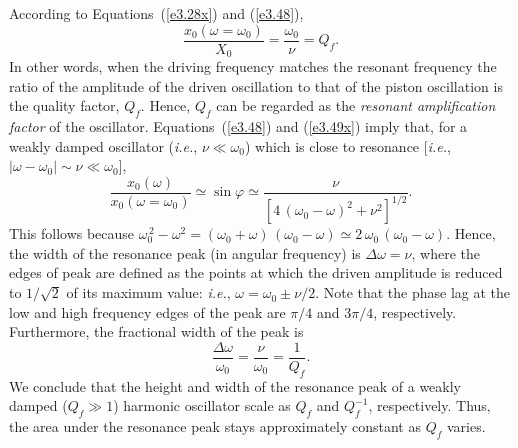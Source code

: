 According to Equations~(\ref{e3.28x}) and (\ref{e3.48}),
\begin{equation}\label{e3.50}
\frac{x_0(\omega=\omega_0)}{X_0} = \frac{\omega_0}{\nu}
=Q_f.
\end{equation}
In other words, when the driving frequency matches the resonant frequency the ratio of the  amplitude of the driven oscillation
to that of the piston oscillation is the quality factor, $Q_f$. Hence, $Q_f$ can be regarded as the {\em resonant
amplification factor}\/ of the oscillator.  
Equations~(\ref{e3.48}) and (\ref{e3.49x}) imply that,
for a weakly damped oscillator ({\em i.e.}, $\nu\ll \omega_0$) which
is close to resonance [{\em i.e.}, $|\omega-\omega_0|\sim \nu\ll \omega_0$],
\begin{equation}\label{e3.51}
\frac{x_0(\omega)}{x_0(\omega=\omega_0)}\simeq \sin\varphi\simeq \frac{\nu}{[4\,(\omega_0-\omega)^2 + \nu^2]^{1/2}}.
\end{equation}
This follows because $\omega_0^{\,2}-\omega^2=(\omega_0+\omega)\,(\omega_0-\omega)\simeq 2\,\omega_0\,(\omega_0-\omega)$. 
Hence, the width of the resonance
peak (in angular frequency) is $\Delta\omega = \nu$, where the edges of peak are defined as the points at which the driven amplitude
is reduced to $1/\sqrt{2}$ of its maximum value: {\em i.e.}, $\omega=\omega_0\pm \nu/2$. Note that the phase lag at the low and high frequency edges of the
peak are $\pi/4$ and $3\pi/4$, respectively.  Furthermore, the
fractional width of the peak is
\begin{equation}
\frac{\Delta \omega}{\omega_0} = \frac{\nu}{\omega_0} = \frac{1}{Q_f}.
\end{equation}
We conclude that the
height and width of the resonance peak of a weakly damped ($Q_f\gg 1$) harmonic oscillator scale as $Q_f$ and
$Q_f^{-1}$, respectively. Thus, the area under the resonance peak stays
approximately constant as $Q_f$ varies. 

